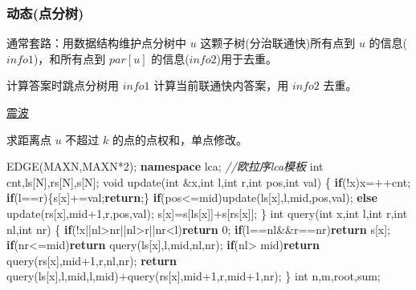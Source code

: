 \documentclass[
]{article}
\newenvironment{Shaded}{}{}
\newcommand{\CommentTok}[1]{\textcolor[rgb]{0.38,0.63,0.69}{\textit{#1}}}
\newcommand{\ControlFlowTok}[1]{\textcolor[rgb]{0.00,0.44,0.13}{\textbf{#1}}}
\newcommand{\DataTypeTok}[1]{\textcolor[rgb]{0.56,0.13,0.00}{#1}}
\newcommand{\DecValTok}[1]{\textcolor[rgb]{0.25,0.63,0.44}{#1}}
\newcommand{\KeywordTok}[1]{\textcolor[rgb]{0.00,0.44,0.13}{\textbf{#1}}}
\newcommand{\NormalTok}[1]{#1}
\begin{document}
\hypertarget{ux52a8ux6001ux70b9ux5206ux6811}{%
\subsubsection{动态(点分树)}\label{ux52a8ux6001ux70b9ux5206ux6811}}

通常套路：用数据结构维护点分树中 \(u\) 这颗子树(分治联通快)所有点到
\(u\) 的信息(\(info1\))，和所有点到 \(par[u]\)
的信息(\(info2\))用于去重。

计算答案时跳点分树用 \(info1\) 计算当前联通快内答案，用 \(info2\) 去重。

\href{https://www.luogu.com.cn/record/38642390}{震波}

求距离点 \(u\) 不超过 \(k\) 的点的点权和，单点修改。

\begin{Shaded}
\begin{Highlighting}[]
\NormalTok{EDGE(MAXN,MAXN*}\DecValTok{2}\NormalTok{);}
\KeywordTok{namespace}\NormalTok{ lca; }\CommentTok{//欧拉序lca模板}
\DataTypeTok{int}\NormalTok{ cnt,ls[N],rs[N],s[N];}
\DataTypeTok{void}\NormalTok{ update(}\DataTypeTok{int}\NormalTok{ \&x,}\DataTypeTok{int}\NormalTok{ l,}\DataTypeTok{int}\NormalTok{ r,}\DataTypeTok{int}\NormalTok{ pos,}\DataTypeTok{int}\NormalTok{ val)}
\NormalTok{\{}
    \ControlFlowTok{if}\NormalTok{(!x)x=++cnt; }\ControlFlowTok{if}\NormalTok{(l==r)\{s[x]+=val;}\ControlFlowTok{return}\NormalTok{;\}}
    \ControlFlowTok{if}\NormalTok{(pos\textless{}=mid)update(ls[x],l,mid,pos,val);}
    \ControlFlowTok{else}\NormalTok{ update(rs[x],mid+}\DecValTok{1}\NormalTok{,r,pos,val);}
\NormalTok{    s[x]=s[ls[x]]+s[rs[x]];}
\NormalTok{\}}
\DataTypeTok{int}\NormalTok{ query(}\DataTypeTok{int}\NormalTok{ x,}\DataTypeTok{int}\NormalTok{ l,}\DataTypeTok{int}\NormalTok{ r,}\DataTypeTok{int}\NormalTok{ nl,}\DataTypeTok{int}\NormalTok{ nr)}
\NormalTok{\{}
    \ControlFlowTok{if}\NormalTok{(!x||nl\textgreater{}nr||nl\textgreater{}r||nr\textless{}l)}\ControlFlowTok{return} \DecValTok{0}\NormalTok{;}
    \ControlFlowTok{if}\NormalTok{(l==nl\&\&r==nr)}\ControlFlowTok{return}\NormalTok{ s[x];}
    \ControlFlowTok{if}\NormalTok{(nr\textless{}=mid)}\ControlFlowTok{return}\NormalTok{ query(ls[x],l,mid,nl,nr);}
    \ControlFlowTok{if}\NormalTok{(nl\textgreater{} mid)}\ControlFlowTok{return}\NormalTok{ query(rs[x],mid+}\DecValTok{1}\NormalTok{,r,nl,nr);}
    \ControlFlowTok{return}\NormalTok{ query(ls[x],l,mid,l,mid)+query(rs[x],mid+}\DecValTok{1}\NormalTok{,r,mid+}\DecValTok{1}\NormalTok{,nr);}
\NormalTok{\}}
\DataTypeTok{int}\NormalTok{ n,m,root,sum;}

\end{Highlighting}
\end{Shaded}
\end{document}
